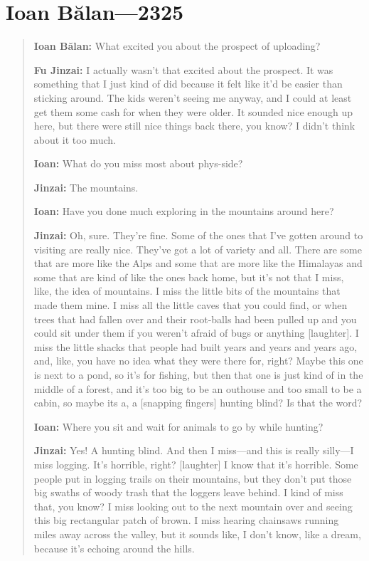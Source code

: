 \hypertarget{ioan-bux103lan-2325}{%
\chapter{Ioan Bălan---2325}\label{ioan-bux103lan-2325}}

\begin{quote}
\textbf{Ioan Bălan:} What excited you about the prospect of uploading?

\textbf{Fu Jinzai:} I actually wasn't that excited about the prospect. It was something that I just kind of did because it felt like it'd be easier than sticking around. The kids weren't seeing me anyway, and I could at least get them some cash for when they were older. It sounded nice enough up here, but there were still nice things back there, you know? I didn't think about it too much.

\textbf{Ioan:} What do you miss most about phys-side?

\textbf{Jinzai:} The mountains.

\textbf{Ioan:} Have you done much exploring in the mountains around here?

\textbf{Jinzai:} Oh, sure. They're fine. Some of the ones that I've gotten around to visiting are really nice. They've got a lot of variety and all. There are some that are more like the Alps and some that are more like the Himalayas and some that are kind of like the ones back home, but it's not that I miss, like, the idea of mountains. I miss the little bits of the mountains that made them mine. I miss all the little caves that you could find, or when trees that had fallen over and their root-balls had been pulled up and you could sit under them if you weren't afraid of bugs or anything {[}laughter{]}. I miss the little shacks that people had built years and years and years ago, and, like, you have no idea what they were there for, right? Maybe this one is next to a pond, so it's for fishing, but then that one is just kind of in the middle of a forest, and it's too big to be an outhouse and too small to be a cabin, so maybe its a, a {[}snapping fingers{]} hunting blind? Is that the word?

\textbf{Ioan:} Where you sit and wait for animals to go by while hunting?

\textbf{Jinzai:} Yes! A hunting blind. And then I miss---and this is really silly---I miss logging. It's horrible, right? {[}laughter{]} I know that it's horrible. Some people put in logging trails on their mountains, but they don't put those big swaths of woody trash that the loggers leave behind. I kind of miss that, you know? I miss looking out to the next mountain over and seeing this big rectangular patch of brown. I miss hearing chainsaws running miles away across the valley, but it sounds like, I don't know, like a dream, because it's echoing around the hills.


\end{quote}

